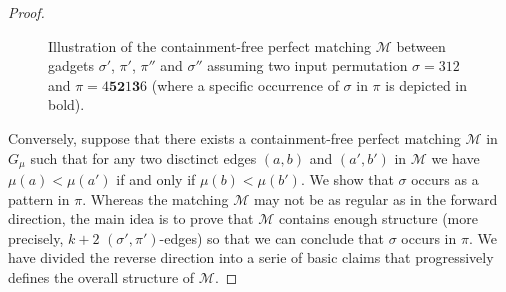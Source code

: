 \documentclass[a4paper]{llncs}
\begin{document}
\begin{proof}
\begin{figure}[t!]
\begin{tikzpicture}
        \end{tikzpicture}
        \caption{\label{fig:subfig:sigma' - pi' - pi'' - sigma''}%
        Illustration of the containment-free perfect matching $\mathcal{M}$
        between gadgets $\sigma'$, $\pi'$, $\pi''$ and $\sigma''$ assuming two
        input permutation $\sigma = 312$ and $\pi = 4\mathbf{5}\mathbf{2}1\mathbf{3}6$
        (where a specific occurrence of $\sigma$ in $\pi$ is depicted in bold).
        }
      \end{figure}

  Conversely, suppose that there exists a containment-free perfect matching
  $\mathcal{M}$ in $G_\mu$ such that for any two disctinct edges
  $(a, b)$ and $(a', b')$ in $\mathcal{M}$
  we have $\mu(a) < \mu(a')$ if and only if $\mu(b) < \mu(b')$.
  We show that $\sigma$ occurs as a pattern in $\pi$.
  Whereas the matching $\mathcal{M}$ may not be as regular as in the forward
  direction, the main idea is to prove that $\mathcal{M}$ contains enough structure
  (more precisely, $k+2$ $(\sigma', \pi')$-edges) so that we can conclude
  that $\sigma$ occurs in $\pi$.
  We have divided the reverse direction into a serie of basic claims that
  progressively defines the overall structure of $\mathcal{M}$.


\end{proof}
\end{document}
